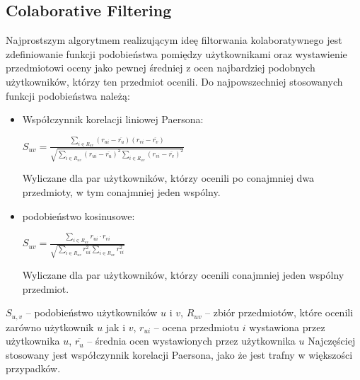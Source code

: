 \documentclass{pracamgr}
\begin{document}
   \subsection{Colaborative Filtering}
   Najprostszym algorytmem realizującym ideę filtorwania kolaboratywnego jest zdefiniowanie funkcji podobieństwa pomiędzy użytkownikami
   oraz wystawienie przedmiotowi oceny jako pewnej średniej z ocen najbardziej podobnych użytkowników, którzy ten przedmiot ocenili.\newline
   Do najpowszechniej stosowanych funkcji podobieństwa należą:
   \begin{itemize}\itemsep1pt \parskip0pt 
    \item Współczynnik korelacji liniowej Paersona:
     \begin{center}
      $S_{uv}=\frac{\sum\limits_{i\in R_{uv}}(r_{ui}-\overline{r_u})(r_{vi}-\overline{r_v})}
      {\sqrt{\sum\limits_{i\in R_{uv}}(r_{ui}-\overline{r_u})^2\sum\limits_{i\in R_{uv}}(r_{vi}-\overline{r_v})^2}}$
     \end{center}
     Wyliczane dla par użytkowników, którzy ocenili po conajmniej dwa przedmioty, w tym conajmniej jeden wspólny.
    \item podobieństwo kosinusowe:
     \begin{center}
      $S_{uv}=\frac{\sum\limits_{i\in R_{uv}}r_{ui}\cdot r_{vi}}
      {\sqrt{\sum\limits_{i\in R_{uv}}r_{ui}^2\sum\limits_{i\in R_{uv}}r_{vi}^2}}$
     \end{center}
     Wyliczane dla par użytkowników, którzy ocenili conajmniej jeden wspólny przedmiot.
   \end{itemize}
   {\scriptsize
   $S_{u,v}$ -- podobieństwo użytkowników $u$ i $v$, $R_{uv}$ -- zbiór przedmiotów, które ocenili zarówno użytkownik $u$ jak i $v$,\newline
   $r_{ui}$ -- ocena przedmiotu $i$ wystawiona przez użytkownika $u$, $\overline{r_{u}}$ -- średnia ocen wystawionych przez użytkownika $u$
   }\newline
   Najczęściej stosowany jest współczynnik korelacji Paersona, jako że jest trafny w większości przypadków.
\end{document}
